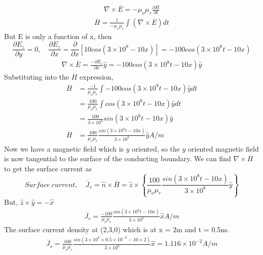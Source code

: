 \begin{exmp}
\begin{align*}
  \nabla\times\overline{E} = -\mu_o\mu_r\frac{\partial\overline{H}}{\partial t}
  \end{align*}
  \begin{align*}
  \overline{H} = \frac{1}{-\mu_o\mu_r}\int (\nabla\times\overline{E})dt
  \end{align*}
  But E is only a function of x, then
  \begin{dmath*}
  \frac{\partial E_z}{\partial y} = 0,\quad \frac{\partial E_z}{\partial x} = \frac{\partial}{\partial x}\left[ 10cos(3\times 10^8 - 10x) \right] = -100cos(3\times 10^8 t - 10x)
  \end{dmath*}
  \begin{align*}
  \nabla\times\overline{E} = \frac{-\partial E_z}{\partial x}\hat{y} = -100cos(3\times10^8t - 10x)\hat{y}
  \end{align*}
  Substituting into the $\overline{H}$ expression,
  \begin{align*}
  \overline{H} &= \frac{-1}{\mu_o\mu_r}\int-100cos(3\times 10^8t - 10x)\hat{y}dt \\
  &=\frac{100}{\mu_o\mu_r}\int cos(3\times 10^8t - 10x)\hat{y}dt \\
  &=\frac{100}{3\times 10^8}sin(3\times 10^8t - 10x)\hat{y}\\
  \overline{H} &= \frac{100}{\mu_o\mu_r}\frac{sin(3\times 10^8t -10x)}{3\times 10^8}\hat{y} A/m
  \end{align*}
  Now we have a magnetic field which is $y$ oriented, so the $y$ oriented magnetic field is now tangential to the surface of the conducting boundary. We can find $\nabla\times\overline{H}$ to get the surface current as
  \begin{dmath*}
  Surface\ current,\quad \overline{J}_s = \hat{n}\times\overline{H} = \hat{z}\times \left\lbrace \frac{100}{\mu_o\mu_r}\frac{sin(3\times 10^8t -10x)}{3\times 10^8}\hat{y} \right\rbrace  
  \end{dmath*}
  But, $\hat{z}\times\hat{y} = -\hat{x}$
  \begin{align*}
  \overline{J}_s = \frac{-100}{\mu_o\mu_r}\frac{sin(3\times 10^8t -10x)}{3\times 10^8}\hat{x} A/m
  \end{align*}
  The surface current density at (2,3,0) which is at x = 2m and t = 0.5ns.
  \begin{align*}
  \overline{J}_s = \frac{100}{\mu_o\mu_r}\frac{sin(3\times 10^8\times 0.5 \times 10^{-9} - 10\times 2)}{3\times 10^8}\hat{x} = 1.116\times 10^{-2} A/m
  \end{align*}
  \end{exmp} 
